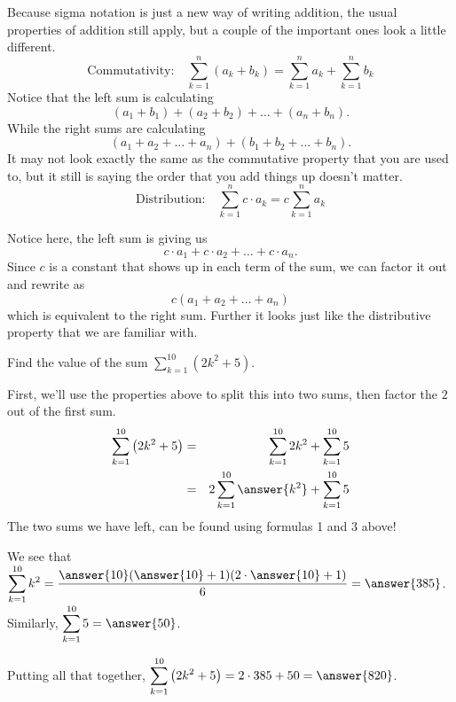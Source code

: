 \documentclass{ximera}
\begin{document}
 

 Because sigma notation is just a new way of writing addition, the usual properties of addition still apply, but a couple of the important ones look a little different.
\[ \text{Commutativity:} \quad \sum_{k=1}^{n} (a_k + b_k) = \sum_{k=1}^n a_k + \sum_{k=1}^n b_k \]
Notice that the left sum is calculating 
\[(a_1+b_1)+(a_2+b_2)+\dots+(a_n+b_n).\]
While the right sums are calculating
\[(a_1+a_2+\dots + a_n)+(b_1+b_2+\dots+b_n).\]
It may not look exactly the same as the commutative property that you are used to, but it still is saying the order that you add things up doesn't matter.
\[ \text{Distribution:}  \quad \sum_{k=1}^{n} c \cdot a_k = c \sum_{k=1}^n a_k \]

Notice here, the left sum is giving us 
\[c\cdot a_1+c\cdot a_2+\dots +c\cdot a_n.\] 
Since $c$ is a constant that shows up in each term of the sum, we can factor it out and rewrite as 
\[c(a_1+a_2+\dots +a_n)\]
which is equivalent to the right sum. Further it looks just like the distributive property that we are familiar with.
\begin{example}
	Find the value of the sum $\displaystyle \sum_{k=1}^{10} \left(2k^2+5\right)$.
	\begin{explanation}
		First, we'll use the properties above to split this into two sums, then factor the $2$ out of the first sum.
		\begin{eqnarray*}
			\sum_{k=1}^{10} \left(2k^2+5\right) &=& \sum_{k=1}^{10} 2k^2 + \sum_{k=1}^{10} 5\\
				&=& 2 \sum_{k=1}^{10} \answer{k^2} + \sum_{k=1}^{10} 5
		\end{eqnarray*}
		The two sums we have left, can be found using formulas 1 and 3 above!
		
		 We see that $\displaystyle \sum_{k=1}^{10} k^2 = \frac{\answer{10}(\answer{10}+1)(2\cdot \answer{10}+1)}{6} = \answer{385}$.  Similarly, $\displaystyle \sum_{k=1}^{10} 5 = \answer{50}$.
		
		 Putting all that together, $\displaystyle \sum_{k=1}^{10}\left(2k^2+5\right) = 2 \cdot 385 + 50 = \answer{820}$.
	\end{explanation}
\end{example}
 
\end{document}
